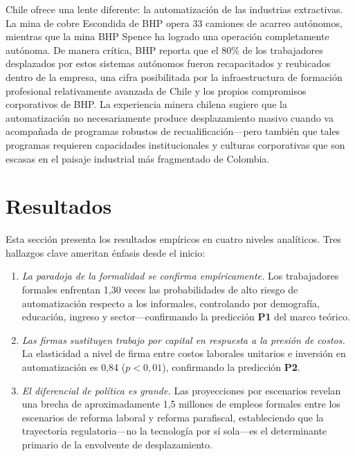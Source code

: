 \documentclass{article}
\begin{document}
Chile ofrece una lente diferente: la automatizaci\'on de las industrias extractivas. La mina de cobre Escondida de BHP opera 33 camiones de acarreo aut\'onomos, mientras que la mina BHP Spence ha logrado una operaci\'on completamente aut\'onoma. De manera cr\'itica, BHP reporta que el 80\% de los trabajadores desplazados por estos sistemas aut\'onomos fueron recapacitados y reubicados dentro de la empresa, una cifra posibilitada por la infraestructura de formaci\'on profesional relativamente avanzada de Chile y los propios compromisos corporativos de BHP. La experiencia minera chilena sugiere que la automatizaci\'on no necesariamente produce desplazamiento masivo cuando va acompa\~nada de programas robustos de recualificaci\'on---pero tambi\'en que tales programas requieren capacidades institucionales y culturas corporativas que son escasas en el paisaje industrial m\'as fragmentado de Colombia.


\FloatBarrier

\section{Resultados}
\label{sec:results}

Esta secci\'on presenta los resultados emp\'iricos en cuatro niveles anal\'iticos. Tres hallazgos clave ameritan \'enfasis desde el inicio:

\begin{enumerate}[label=\textbf{Resultado \arabic*:}]
\item \textit{La paradoja de la formalidad se confirma emp\'iricamente.} Los trabajadores formales enfrentan 1,30 veces las probabilidades de alto riesgo de automatizaci\'on respecto a los informales, controlando por demograf\'ia, educaci\'on, ingreso y sector---confirmando la predicci\'on \textbf{P1} del marco te\'orico.
\item \textit{Las firmas sustituyen trabajo por capital en respuesta a la presi\'on de costos.} La elasticidad a nivel de firma entre costos laborales unitarios e inversi\'on en automatizaci\'on es 0,84 ($p < 0,01$), confirmando la predicci\'on \textbf{P2}.
\item \textit{El diferencial de pol\'itica es grande.} Las proyecciones por escenarios revelan una brecha de aproximadamente 1,5 millones de empleos formales entre los escenarios de reforma laboral y reforma parafiscal, estableciendo que la trayectoria regulatoria---no la tecnolog\'ia por s\'i sola---es el determinante primario de la envolvente de desplazamiento.
\end{enumerate}
\end{document}
